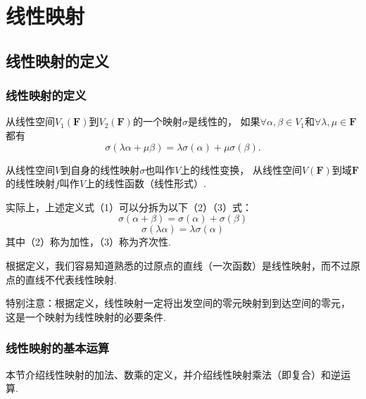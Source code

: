 \chapter{线性映射}

\section{线性映射的定义}
\subsection{线性映射的定义}
\begin{definition}
	从线性空间$V_1(\mathbf{F})$到$V_2(\mathbf{F})$的一个映射$\sigma$是线性的，
	如果$\forall \alpha,\beta \in V_1$和$\forall \lambda,\mu \in \mathbf{F}$都有
	\begin{equation}
		\sigma(\lambda\alpha+\mu\beta)=\lambda\sigma(\alpha)+\mu\sigma(\beta).
	\end{equation}
	
	从线性空间$V$到自身的线性映射$\sigma$也叫作$V$上的线性变换，
	从线性空间$V(\mathbf{F})$到域$\mathbf{F}$的线性映射$f$叫作$V$上的线性函数（线性形式）.
\end{definition}
实际上，上述定义式（1）可以分拆为以下（2）（3）式：
\begin{equation}
	\sigma(\alpha+\beta)=\sigma(\alpha)+\sigma(\beta)
\end{equation}
\begin{equation}
	\sigma(\lambda\alpha)=\lambda\sigma(\alpha)
\end{equation}
其中（2）称为加性，（3）称为齐次性.

根据定义，我们容易知道熟悉的过原点的直线（一次函数）是线性映射，而不过原点的直线不代表线性映射.

特别注意：根据定义，线性映射一定将出发空间的零元映射到到达空间的零元，
这是一个映射为线性映射的必要条件.
\subsection{线性映射的基本运算}
本节介绍线性映射的加法、数乘的定义，并介绍线性映射乘法（即复合）和逆运算.

